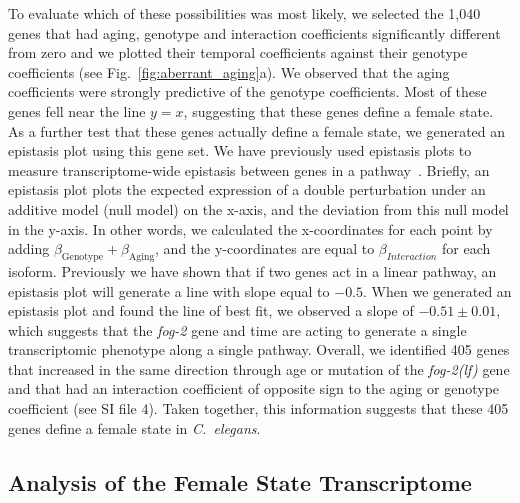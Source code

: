 \documentclass[10pt,letterpaper,twocolumn]{article}
\newcommand{\cel}{\emph{C.~elegans}}
\newcommand{\fog}{\emph{\mbox{fog-2(lf)}}}
\newcommand{\gene}[1]{\emph{\mbox{#1}}}
\newcommand{\intersectn}{1,040}
\newcommand{\femalen}{405}
\begin{document}
To evaluate which of these possibilities was most likely, we selected
the \intersectn{} genes that had aging, genotype and interaction coefficients
significantly different from zero and we plotted their temporal coefficients
against their genotype coefficients (see Fig.~\ref{fig:aberrant_aging}a). We
observed that the aging coefficients were strongly predictive of the genotype
coefficients. Most of these genes fell near the line $y=x$, suggesting that these
genes define a female state. As a further test that these genes actually define
a female state, we generated an epistasis plot using this gene set. We have
previously used epistasis plots to measure transcriptome-wide epistasis between
genes in a pathway~\cite{Angeles-Albores2017}.
Briefly, an epistasis plot plots the expected expression of a double perturbation
under an additive model (null model) on the x-axis, and the deviation from this
null model in the y-axis. In other words, we calculated the x-coordinates for each
point by adding $\beta_\mathrm{Genotype} + \beta_\mathrm{Aging}$, and the
y-coordinates are equal to $\beta_{Interaction}$ for each isoform.
Previously we have shown that if two genes act in a
linear pathway, an epistasis plot will generate a line with slope equal to $-0.5$.
When we generated an epistasis plot and found the line of best fit, we observed
a slope of $-0.51\pm 0.01$, which suggests that the \gene{fog-2} gene and time
are acting to generate a single transcriptomic phenotype along a single pathway.
Overall, we identified
\femalen{} genes that increased in the same direction through age or mutation
of the \fog{} gene and that had an interaction coefficient of opposite sign to
the aging or genotype coefficient (see SI file 4). Taken together, this
information suggests that these \femalen{} genes define a female state in
\cel{}.

\subsection*{Analysis of the Female State Transcriptome}
\end{document}

